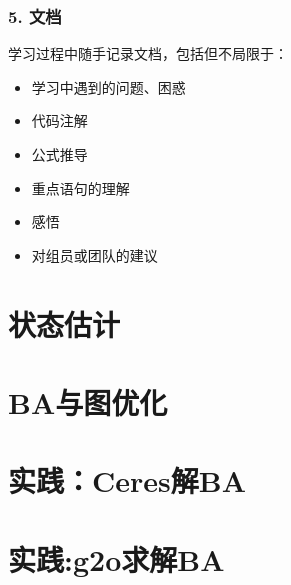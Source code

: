\documentclass[letterpaper,10pt,english]{sphinxmanual}
\begin{document}
\subsubsection{5. 文档}
\label{\detokenize{ch9/ch9_u5b66_u4e60_u8ba1_u5212:id5}}
\sphinxAtStartPar
学习过程中随手记录文档，包括但不局限于：
\begin{itemize}
\item {} 
\sphinxAtStartPar
学习中遇到的问题、困惑

\item {} 
\sphinxAtStartPar
代码注解

\item {} 
\sphinxAtStartPar
公式推导

\item {} 
\sphinxAtStartPar
重点语句的理解

\item {} 
\sphinxAtStartPar
感悟

\item {} 
\sphinxAtStartPar
对组员或团队的建议

\end{itemize}


\section{状态估计}
\label{\detokenize{ch9/_u72b6_u6001_u4f30_u8ba1:id1}}\label{\detokenize{ch9/_u72b6_u6001_u4f30_u8ba1::doc}}

\section{BA与图优化}
\label{\detokenize{ch9/BA_u4e0e_u56fe_u4f18_u5316:ba}}\label{\detokenize{ch9/BA_u4e0e_u56fe_u4f18_u5316::doc}}

\section{实践：Ceres解BA}
\label{\detokenize{ch9/_u5b9e_u8df5:Ceres_u89e3BA:ceresba}}\label{\detokenize{ch9/_u5b9e_u8df5:Ceres_u89e3BA::doc}}

\section{实践:g2o求解BA}
\label{\detokenize{ch9/_u5b9e_u8df5:g2o_u6c42_u89e3BA:g2oba}}\label{\detokenize{ch9/_u5b9e_u8df5:g2o_u6c42_u89e3BA::doc}}


\renewcommand{\indexname}{索引}
\printindex
\end{document}
